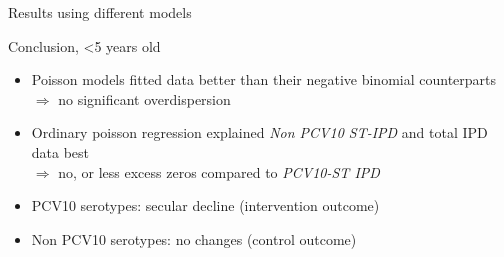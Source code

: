 \documentclass{beamer}\usepackage[]{graphicx}\usepackage[]{color}
\begin{document}
\begin{frame}[fragile]{Results using different models}
\begin{center}
\begin{table}[ht]
\centering
\caption{Model output (RRs and p-values) of different models using PCV10-ST IPD data including molecular typed cases on <5 years old, Austria, 2012 -- 2016/05} 
\end{table}

\end{center}
\end{frame}

\begin{frame}[fragile]{Conclusion, <5 years old}
\begin{center}
\begin{itemize}
  \item Poisson models fitted data better than their negative binomial counterparts\\
  $\Rightarrow$ no significant overdispersion
  \item Ordinary poisson regression explained \textit{Non PCV10 ST-IPD} and total IPD data best\\
  $\Rightarrow$ no, or less excess zeros compared to \textit{PCV10-ST IPD}
  \item PCV10 serotypes: secular decline (intervention outcome)
  \item Non PCV10 serotypes: no changes (control outcome)
\end{itemize}
\end{center}
\end{frame}
\end{document}

